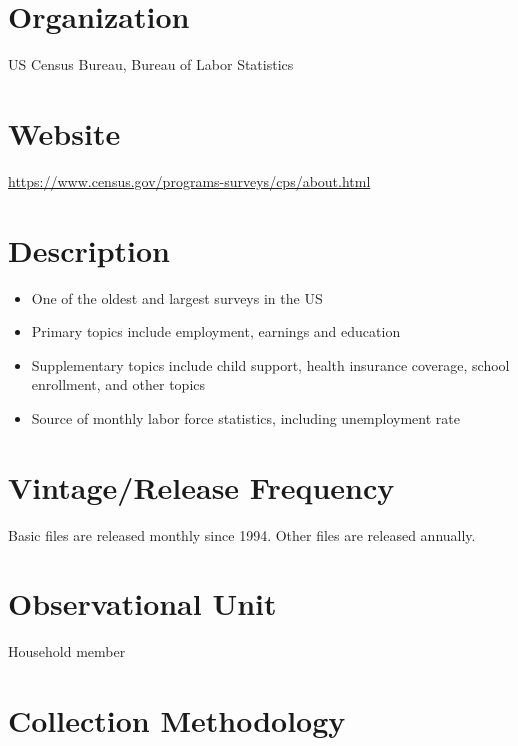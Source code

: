 \documentclass[
]{book}
\providecommand{\tightlist}{%
  \setlength{\itemsep}{0pt}\setlength{\parskip}{0pt}}
\begin{document}
\hypertarget{organization-22}{%
\section{Organization}\label{organization-22}}

US Census Bureau, Bureau of Labor Statistics

\hypertarget{website-22}{%
\section{Website}\label{website-22}}

\url{https://www.census.gov/programs-surveys/cps/about.html}

\hypertarget{description-22}{%
\section{Description}\label{description-22}}

\begin{itemize}
\tightlist
\item
  One of the oldest and largest surveys in the US
\item
  Primary topics include employment, earnings and education
\item
  Supplementary topics include child support, health insurance coverage, school enrollment, and other topics
\item
  Source of monthly labor force statistics, including unemployment rate
\end{itemize}

\hypertarget{vintagerelease-frequency-22}{%
\section{Vintage/Release Frequency}\label{vintagerelease-frequency-22}}

Basic files are released monthly since 1994. Other files are released annually.

\hypertarget{observational-unit-22}{%
\section{Observational Unit}\label{observational-unit-22}}

Household member

\hypertarget{collection-methodology-22}{%
\section{Collection Methodology}\label{collection-methodology-22}}
\end{document}
